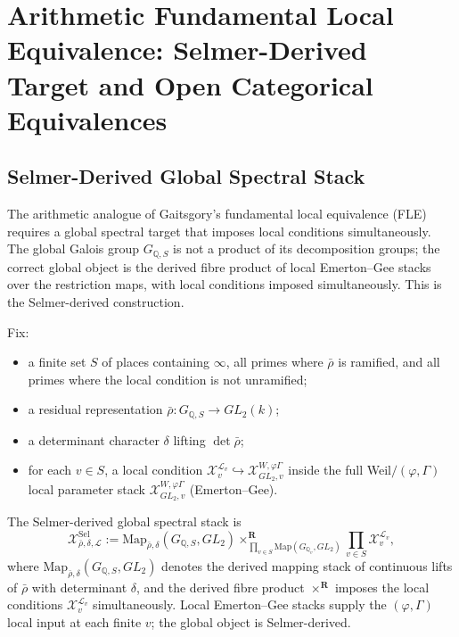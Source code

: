 \chapter{Arithmetic Fundamental Local Equivalence: Selmer-Derived Target and Open Categorical Equivalences}
\label{v4-arith:fle-completion-ledger}

\section{Selmer-Derived Global Spectral Stack}
\label{v4-arith:fle-ledger:spectral-target}

The arithmetic analogue of Gaitsgory's fundamental local equivalence (FLE) requires a global spectral target that imposes local conditions simultaneously. The global Galois group \(G_{\mathbb{Q},S}\) is not a product of its decomposition groups; the correct global object is the derived fibre product of local Emerton--Gee stacks over the restriction maps, with local conditions imposed simultaneously. This is the Selmer-derived construction.

\begin{definition}
\label{v4-arith:fle-ledger:def:selmer-stack}
Fix:
\begin{itemize}
\item a finite set \(S\) of places containing \(\infty\), all primes
where \(\bar\rho\) is ramified, and all primes where the local
condition is not unramified;
\item a residual representation
\(\bar\rho\colon G_{\mathbb{Q},S}\to GL_{2}(k)\);
\item a determinant character \(\delta\) lifting \(\det\bar\rho\);
\item for each \(v\in S\), a local condition
\(\mathcal{X}^{\mathcal{L}_{v}}_{v}\hookrightarrow
\mathcal{X}^{W,\varphi\Gamma}_{GL_{2},v}\) inside the full
Weil\(/(\varphi,\Gamma)\) local parameter stack
\(\mathcal{X}^{W,\varphi\Gamma}_{GL_{2},v}\) (Emerton--Gee).
\end{itemize}
The Selmer-derived global spectral stack is
\begin{equation}
\label{v4-arith:fle-ledger:eq:selmer-stack}
\mathcal{X}^{\mathrm{Sel}}_{\bar\rho,\delta,\mathcal{L}}
:=
\mathrm{Map}_{\bar\rho,\delta}(G_{\mathbb{Q},S},GL_{2})
\times^{\mathbf{R}}_{\prod_{v\in S}\mathrm{Map}(G_{\mathbb{Q}_{v}},GL_{2})}
\prod_{v\in S}\mathcal{X}^{\mathcal{L}_{v}}_{v},
\end{equation}
where \(\mathrm{Map}_{\bar\rho,\delta}(G_{\mathbb{Q},S},GL_{2})\)
denotes the derived mapping stack of continuous lifts of \(\bar\rho\)
with determinant \(\delta\), and the derived fibre product
\(\times^{\mathbf{R}}\) imposes the local conditions
\(\mathcal{X}^{\mathcal{L}_{v}}_{v}\) simultaneously. Local
Emerton--Gee stacks supply the \((\varphi,\Gamma)\) local input
at each finite \(v\); the global object is Selmer-derived.
\end{definition}

